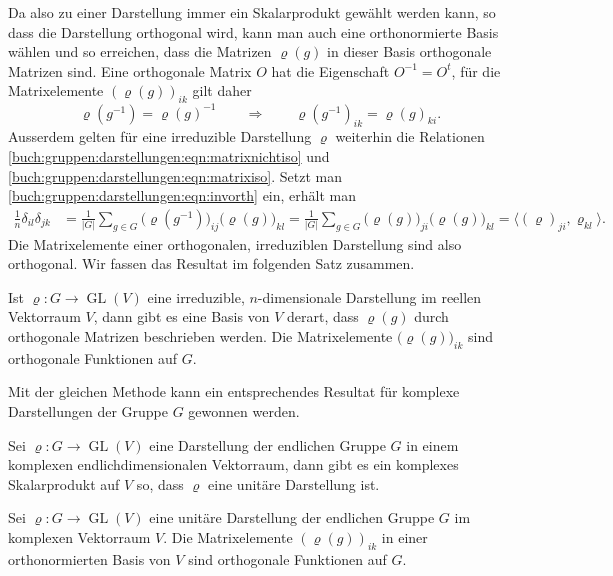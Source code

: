 Da also zu einer Darstellung immer ein Skalarprodukt gewählt werden
kann, so dass die Darstellung orthogonal wird, kann man auch eine
orthonormierte Basis wählen und so erreichen, dass die Matrizen
$\varrho(g)$ in dieser Basis orthogonale Matrizen sind.
Eine orthogonale Matrix $O$ hat die Eigenschaft $O^{-1} = O^t$,
für die Matrixelemente $(\varrho(g))_{ik}$ gilt daher
\begin{equation}
\varrho(g^{-1})
=
\varrho(g)^{-1}
\qquad\Rightarrow\qquad
\varrho(g^{-1})_{ik}
=
\varrho(g)_{ki}.
\label{buch:gruppen:darstellungen:eqn:invorth}
\end{equation}
Ausserdem gelten für eine irreduzible Darstellung $\varrho$
weiterhin die Relationen
\eqref{buch:gruppen:darstellungen:eqn:matrixnichtiso}
und
\eqref{buch:gruppen:darstellungen:eqn:matrixiso}.
Setzt man \eqref{buch:gruppen:darstellungen:eqn:invorth} ein, erhält man
\begin{align*}
\frac{1}{n}
\delta_{il}\delta_{jk}
&=
\frac{1}{|G|}
\sum_{g\in G}
\bigl(\varrho(g^{-1})\bigr)_{ij}
\bigl(\varrho(g)\bigr)_{kl}
=
\frac{1}{|G|}
\sum_{g\in G}
\bigl(\varrho(g)\bigr)_{ji}
\bigl(\varrho(g)\bigr)_{kl}
=
\langle (\varrho)_{ji},\varrho_{kl}\rangle.
\end{align*}
Die Matrixelemente einer orthogonalen, irreduziblen Darstellung
sind also orthogonal.
Wir fassen das Resultat im folgenden Satz zusammen.

\begin{satz}
Ist $\varrho\colon G\to\operatorname{GL}(V)$ eine irreduzible,
$n$-dimensionale Darstellung im reellen Vektorraum $V$, dann gibt
es eine Basis von $V$ derart, dass $\varrho(g)$ durch orthogonale
Matrizen beschrieben werden.
Die Matrixelemente $\bigl(\varrho(g)\bigr)_{ik}$ sind orthogonale
Funktionen auf $G$.
\end{satz}

Mit der gleichen Methode kann ein entsprechendes Resultat für komplexe
Darstellungen der Gruppe $G$ gewonnen werden.

\begin{satz}
Sei $\varrho\colon G\to\operatorname{GL}(V)$ eine Darstellung der endlichen
Gruppe $G$ in einem komplexen endlichdimensionalen Vektorraum, dann gibt
es ein komplexes Skalarprodukt auf $V$ so, dass $\varrho$ eine unitäre
Darstellung ist.
\end{satz}

\begin{satz}
Sei $\varrho\colon G\to\operatorname{GL}(V)$ eine unitäre Darstellung
der endlichen Gruppe $G$ im komplexen Vektorraum $V$.
Die Matrixelemente $(\varrho(g))_{ik}$ in einer orthonormierten Basis
von $V$ sind orthogonale Funktionen auf $G$.
\end{satz}

